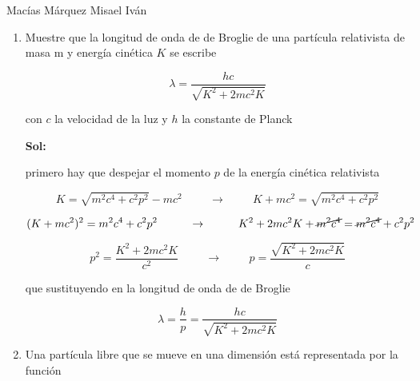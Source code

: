 \documentclass[12pt,a4paper]{article}
\begin{document}
Macías Márquez  Misael Iván
\begin{enumerate}






    \item Muestre que la longitud de onda de  de Broglie de una partícula relativista de masa m y energía cinética $K$ se escribe
    
    \begin{equation*}
        \lambda = \frac{hc}{\sqrt{K^2 +2mc^2 K}}
    \end{equation*}
    
    con $c$ la velocidad de la luz y $h$ la constante de Planck
    
    \textbf{Sol:}
    
    primero hay que despejar el momento $p$ de la energía cinética relativista
    
    \begin{equation*}
        K = \sqrt{m^2 c^4 + c^2 p^2} - mc^2 \hspace{1cm} \rightarrow \hspace{1cm} K+mc^2 = \sqrt{m^2 c^4 + c^2 p^2}
    \end{equation*}
    
    \begin{equation*}
        (K + mc^2)^2 = m^2 c^4 + c^2 p^2 \hspace{1cm} \rightarrow \hspace{1cm} K^2 + 2mc^2K + \cancel{m^2 c^4} = \cancel{m^2 c^4} + c^2 p^2
    \end{equation*}
    
    \begin{equation*}
        p^2 = \frac{K^2 + 2mc^2 K}{c^2} \hspace{1cm} \rightarrow \hspace{1cm} p = \frac{\sqrt{K^2 + 2mc^2 K}}{c}
    \end{equation*}
    
    que sustituyendo en la longitud de onda de de Broglie
    
    \begin{equation*}
        \lambda = \frac{h}{p} = \frac{hc}{\sqrt{K^2 + 2mc^2 K}}
    \end{equation*}
    
    
    
    
    
    
    \item Una partícula libre que se mueve en una dimensión está representada por la función
    

\end{enumerate}
\end{document}
